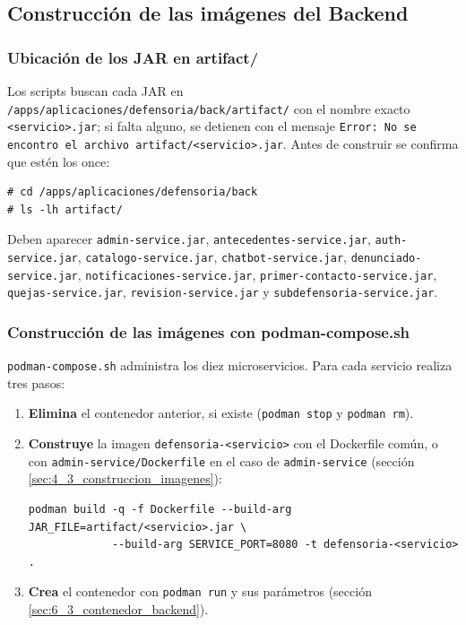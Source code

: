 \subsection{Construcción de las imágenes del Backend}\label{sec:6_1_imagenes_microservicios}

\subsubsection{Ubicación de los JAR en artifact/}
Los scripts buscan cada JAR en \nolinkurl{/apps/aplicaciones/defensoria/back/artifact/} con el nombre exacto \texttt{<servicio>.jar}; si falta alguno, se detienen con el mensaje \texttt{Error: No se encontro el archivo artifact/<servicio>.jar}. Antes de construir se confirma que estén los once:
\begin{lstlisting}
# cd /apps/aplicaciones/defensoria/back
# ls -lh artifact/
\end{lstlisting}
Deben aparecer \texttt{admin-service.jar}, \texttt{antecedentes-service.jar}, \texttt{auth-service.jar}, \texttt{catalogo-service.jar}, \texttt{chatbot-service.jar}, \texttt{denunciado-service.jar}, \texttt{notificaciones-service.jar}, \texttt{primer-contacto-service.jar}, \texttt{quejas-service.jar}, \texttt{revision-service.jar} y \texttt{subdefensoria-service.jar}.

\subsubsection{Construcción de las imágenes con podman-compose.sh}
\texttt{podman-compose.sh} administra los diez microservicios. Para cada servicio realiza tres pasos:
\begin{enumerate}
  \item \textbf{Elimina} el contenedor anterior, si existe (\texttt{podman stop} y \texttt{podman rm}).
  \item \textbf{Construye} la imagen \texttt{defensoria-<servicio>} con el Dockerfile común, o con \texttt{admin-service/Dockerfile} en el caso de \texttt{admin-service} (sección \ref{sec:4_3_construccion_imagenes}):
\begin{lstlisting}
podman build -q -f Dockerfile --build-arg JAR_FILE=artifact/<servicio>.jar \
             --build-arg SERVICE_PORT=8080 -t defensoria-<servicio> .
\end{lstlisting}
  \item \textbf{Crea} el contenedor con \texttt{podman run} y sus parámetros (sección \ref{sec:6_3_contenedor_backend}).
\end{enumerate}

